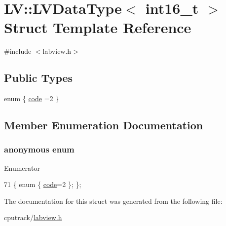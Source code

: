 \hypertarget{struct_l_v_1_1_l_v_data_type_3_01int16__t_01_4}{}\section{LV\+:\+:L\+V\+Data\+Type$<$ int16\+\_\+t $>$ Struct Template Reference}
\label{struct_l_v_1_1_l_v_data_type_3_01int16__t_01_4}


{\ttfamily \#include $<$labview.\+h$>$}

\subsection*{Public Types}
\begin{DoxyCompactItemize}
\item 
enum \{ \hyperlink{struct_l_v_1_1_l_v_data_type_3_01int16__t_01_4_a5fb69a4e5fd7b707089577f1435acd5caab20bae723c25543a497ee5d62b0b267}{code} =2
 \}
\end{DoxyCompactItemize}


\subsection{Member Enumeration Documentation}
\subsubsection[{\texorpdfstring{anonymous enum}{anonymous enum}}]{\setlength{\rightskip}{0pt plus 5cm}anonymous enum}\hypertarget{struct_l_v_1_1_l_v_data_type_3_01int16__t_01_4_a5fb69a4e5fd7b707089577f1435acd5c}{}\label{struct_l_v_1_1_l_v_data_type_3_01int16__t_01_4_a5fb69a4e5fd7b707089577f1435acd5c}
\begin{Desc}
\item[Enumerator]\par
\begin{description}
\item[{\em 
code\hypertarget{struct_l_v_1_1_l_v_data_type_3_01int16__t_01_4_a5fb69a4e5fd7b707089577f1435acd5caab20bae723c25543a497ee5d62b0b267}{}\label{struct_l_v_1_1_l_v_data_type_3_01int16__t_01_4_a5fb69a4e5fd7b707089577f1435acd5caab20bae723c25543a497ee5d62b0b267}
}]\end{description}
\end{Desc}

\begin{DoxyCode}
71 \{ \textcolor{keyword}{enum} \{ \hyperlink{struct_l_v_1_1_l_v_data_type_3_01int16__t_01_4_a5fb69a4e5fd7b707089577f1435acd5caab20bae723c25543a497ee5d62b0b267}{code}=2 \}; \};
\end{DoxyCode}


The documentation for this struct was generated from the following file\+:\begin{DoxyCompactItemize}
\item 
cputrack/\hyperlink{labview_8h}{labview.\+h}\end{DoxyCompactItemize}
